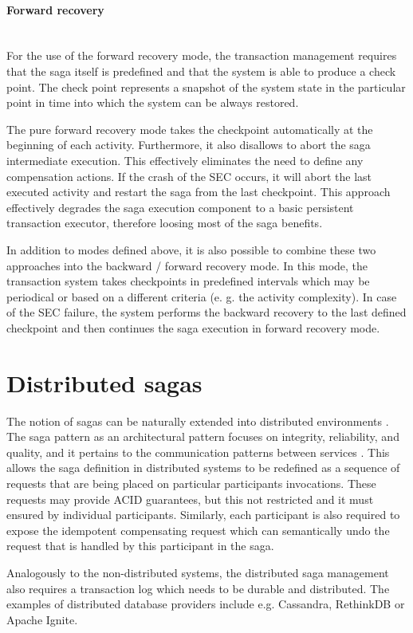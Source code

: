 \documentclass[oneside,
  digital, %
  table,   %
  nolof,     %
  nolot,     %
]{fithesis3}
\newcommand{\newlinepar}[1]{\paragraph{#1}\needspace{4\baselineskip}\mbox{}\\}
\begin{document}
\newlinepar{Forward recovery}

For the use of the forward recovery mode, the transaction management requires that the saga itself is predefined and that the system is able to produce a check point. The check point represents a snapshot of the system state in the particular point in time into which the system can be always restored.

The pure forward recovery mode takes the checkpoint automatically at the beginning of each activity. Furthermore, it also disallows to abort the saga intermediate execution. This effectively eliminates the need to define any compensation actions. If the crash of the SEC occurs, it will abort the last executed activity and restart the saga from the last checkpoint. This approach effectively degrades the saga execution component to a basic persistent transaction executor, therefore loosing most of the saga benefits.

\hfill \break

In addition to modes defined above, it is also possible to combine these two approaches into the backward / forward recovery mode. In this mode, the transaction system takes checkpoints in predefined intervals which may be periodical or based on a different criteria (e. g. the activity complexity). In case of the SEC failure, the system performs the backward recovery to the last defined checkpoint and then continues the saga execution in forward recovery mode.

\section{Distributed sagas}

The notion of sagas can be naturally extended into distributed environments \cite{sagas_publ}. The saga pattern as an architectural pattern focuses on integrity, reliability, and quality, and it pertains to the communication patterns between services \cite{prac_ms}. This allows the saga definition in distributed systems to be redefined as a sequence of requests that are being placed on particular participants invocations. These requests may provide ACID guarantees, but this not restricted and it must ensured by individual participants. Similarly, each participant is also required to expose the idempotent compensating request which can semantically undo the request that is handled by this participant in the saga.

Analogously to the non-distributed systems, the distributed saga management also requires a transaction log which needs to be durable and distributed. The examples of distributed database providers include e.g. Cassandra, RethinkDB or Apache Ignite.
\end{document}
